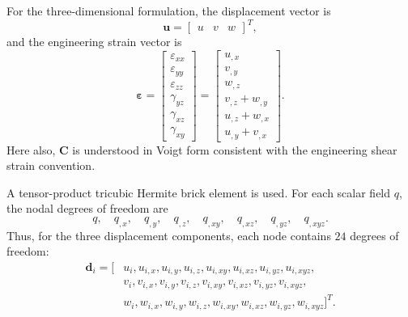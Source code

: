 \documentclass[final,3p,times,fleqn]{elsarticle}
\begin{document}
For the three-dimensional formulation, the displacement vector is
\begin{equation}
\label{eq:3d_displacement}
\mathbf{u}
=
\begin{bmatrix}
u & v & w
\end{bmatrix}^{T},
\end{equation}
and the engineering strain vector is
\begin{equation}
\label{eq:3d_fem_strain_vector}
\boldsymbol{\varepsilon}
=
\begin{bmatrix}
\varepsilon_{xx} \\
\varepsilon_{yy} \\
\varepsilon_{zz} \\
\gamma_{yz} \\
\gamma_{xz} \\
\gamma_{xy}
\end{bmatrix}
=
\begin{bmatrix}
u_{,x} \\
v_{,y} \\
w_{,z} \\
v_{,z}+w_{,y} \\
u_{,z}+w_{,x} \\
u_{,y}+v_{,x}
\end{bmatrix}.
\end{equation}
Here also, $\mathbf{C}$ is understood in Voigt form consistent with the
engineering shear strain convention.

A tensor-product tricubic Hermite brick element is used. For each scalar
field $q$, the nodal degrees of freedom are
\begin{equation}
\label{eq:3d_scalar_hermite_dofs}
q,
\quad
q_{,x},
\quad
q_{,y},
\quad
q_{,z},
\quad
q_{,xy},
\quad
q_{,xz},
\quad
q_{,yz},
\quad
q_{,xyz}.
\end{equation}
Thus, for the three displacement components, each node contains
$24$ degrees of freedom:
\begin{equation}
\label{eq:3d_hermite_dofs_fem}
\begin{aligned}
\mathbf{d}_i=[&
u_i,u_{i,x},u_{i,y},u_{i,z},u_{i,xy},u_{i,xz},u_{i,yz},u_{i,xyz},\\
&
v_i,v_{i,x},v_{i,y},v_{i,z},v_{i,xy},v_{i,xz},v_{i,yz},v_{i,xyz},\\
&
w_i,w_{i,x},w_{i,y},w_{i,z},w_{i,xy},w_{i,xz},w_{i,yz},w_{i,xyz}
]^T .
\end{aligned}
\end{equation}
\end{document}
